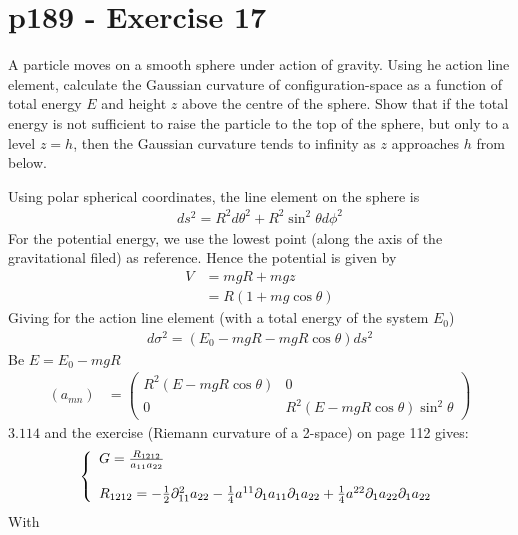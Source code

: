 \section{p189 - Exercise 17}
\begin{tcolorbox}
A particle moves on a smooth sphere under action of gravity. Using he action line element, calculate the Gaussian curvature of configuration-space as a function of total energy $E$ and height $z$ above the centre of the sphere. Show that if the total energy is not sufficient to raise the particle to the top of the sphere, but only to a level $z=h$, then the Gaussian curvature tends to infinity as $z$ approaches $h$ from below.
\end{tcolorbox} 
Using polar spherical coordinates, the line element on the sphere is 
\begin{align}
ds^2= R^2d\theta^2 + R^2\sin^2 \theta d\phi^2
\end{align}
For the potential energy, we use the lowest point (along the axis of the gravitational filed) as reference. Hence the potential is given by
\begin{align}
V&= mgR + mgz\\
&= R\left(1+mg\cos\theta\right)
\end{align}
Giving for the action line element (with a total energy of the system $E_0$)
\begin{align}
d\sigma^2 = \left(E_0-mgR-mgR\cos\theta\right)ds^2
\end{align}
Be $E=E_0-mgR$
\begin{align}
\left(a_{mn}\right)&= \left(\begin{array}{cc}
R^2\left(E-mgR\cos\theta\right)&0\\
0&R^2\left(E-mgR\cos\theta\right)\sin^2 \theta 
\end{array}\right)
\end{align}
$\mathbf{3.114}$ and the exercise (Riemann curvature of a 2-space) on page 112 gives:
\begin{align}
\left\{\begin{array}{l}
G= \frac{R_{1212}}{a_{11}a_{22}}\\\\
R_{1212}= -\frac{1}{2}\partial_{11}^2a_{22}-\frac{1}{4}a^{11}\partial_1 a_{11}\partial_1 a_{22}+\frac{1}{4}a^{22}\partial_1 a_{22}\partial_1 a_{22}
\end{array}\right.
\end{align}
With
